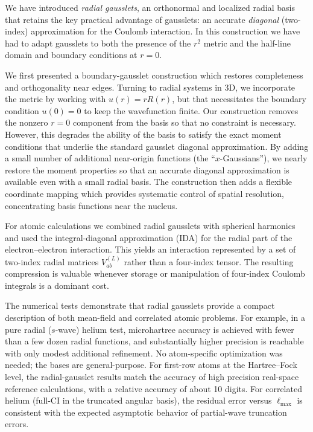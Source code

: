 \documentclass[aps,pra,reprint,longbibliography,nofootinbib]{revtex4-2}
\begin{document}
We have introduced \emph{radial gausslets}, an orthonormal and localized radial basis that retains the key practical advantage of gausslets: an accurate \emph{diagonal} (two-index) approximation for the Coulomb interaction.  In this construction we have had to adapt gausslets to both the presence of the $r^2$ metric and the half-line domain and boundary conditions at $r=0$.  

We first presented a boundary-gausslet construction which restores completeness and orthogonality near edges.  Turning to radial systems in 3D, we incorporate the metric by working with $u(r)=r R(r)$, but that necessitates the boundary condition $u(0)=0$ to keep the wavefunction finite. Our construction removes the nonzero $r=0$ component from the basis so that no constraint is necessary.  However, this degrades the ability of the basis to satisfy the exact moment conditions that underlie the standard gausslet diagonal approximation.  By adding a small number of additional near-origin functions (the ``$x$-Gaussians''), we nearly restore the moment properties so that an accurate diagonal approximation is available even with a small radial basis. The construction then adds a flexible coordinate mapping which provides systematic control of spatial resolution, concentrating basis functions near the nucleus.

For atomic calculations we combined radial gausslets with spherical harmonics and used the integral-diagonal approximation (IDA) for the radial part of the electron--electron interaction.  This yields an interaction represented by a set of two-index radial matrices $V^{(L)}_{ab}$ rather than a four-index tensor.  The resulting compression is valuable whenever storage or manipulation of four-index Coulomb integrals is a dominant cost.  

The numerical tests demonstrate that radial gausslets provide a compact description of both mean-field and correlated atomic problems.  For example, in a pure radial ($s$-wave) helium test, microhartree accuracy is achieved with fewer than a few dozen radial functions, and substantially higher precision is reachable with only modest additional refinement. No atom-specific optimization was needed; the bases are general-purpose.  For first-row atoms at the Hartree--Fock level, the radial-gausslet results match the accuracy of high precision real-space reference calculations, with a relative accuracy of about 10 digits.  For correlated helium (full-CI in the truncated angular basis), the residual error versus $\ell_{\max}$ is consistent with the expected asymptotic behavior of partial-wave truncation errors.
\end{document}
